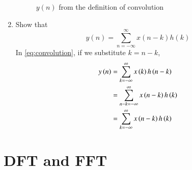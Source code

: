 \documentclass[journal,12pt,twocolumn]{IEEEtran}
\theoremstyle{remark}
\begin{document}
\begin{enumerate}[label=\thesection.\arabic*]
\begin{figure}[H]
\caption{$y(n)$ from the definition of convolution}
\label{fig:ynconv}
\end{figure}
\item Show that
\begin{equation}
y(n) =  \sum_{n=-\infty}^{\infty}x(n-k)h(k)
\end{equation}
\solution
In \eqref{eq:convolution}, if we substitute $k = n - k$,
\begin{align}
y\left(n\right) &= \sum_{k=-\infty}^{\infty}x\left(k\right)h\left(n - k\right) \\
		  &= \sum_{n - k=-\infty}^{\infty}x\left(n - k\right)h\left(k\right) \\
		  &= \sum_{k=-\infty}^{\infty}x\left(n - k\right)h\left(k\right)
\end{align}
\end{enumerate}
\section{DFT and FFT}
\end{document}
